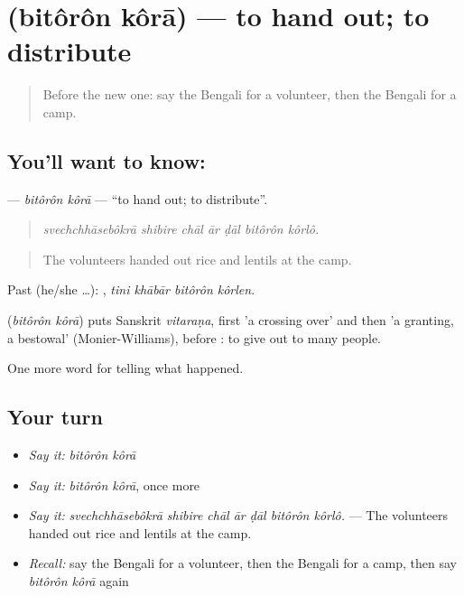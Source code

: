\section[\texorpdfstring{\bn{বিতরণ} \bn{করা} (bitôrôn kôrā)}{বিতরণ করা (bitôrôn kôrā)}]{  (bitôrôn kôrā) — to hand out; to distribute}

\label{lesson:BN-C291-bitoron-kora}



\begin{quote}
Before the new one: say the Bengali for a volunteer, then the Bengali for a camp.
\end{quote}

\subsection*{You'll want to know:  }
\textbf{ } — \emph{bitôrôn kôrā} — \textquotedblleft{}to hand out; to distribute\textquotedblright{}.

\begin{quote}
      
\end{quote}

\begin{quote}
\emph{svechchhāsebôkrā shibire chāl ār ḍāl bitôrôn kôrlô.}
\end{quote}

\begin{quote}
The volunteers handed out rice and lentils at the camp.
\end{quote}

Past (he/she …):    , \emph{tini khābār bitôrôn kôrlen}.

\begin{cousinweb}
\textbf{ } (\emph{bitôrôn kôrā}) puts Sanskrit \emph{vitaraṇa}, first 'a crossing over' and then 'a granting, a bestowal' (Monier-Williams), before : to give out to many people.
\end{cousinweb}

\begin{grammarlens}[title={What you've built}]
One more word for telling what happened.
\end{grammarlens}

\subsection*{Your turn}
\begin{itemize}
\raggedright
  \item \emph{Say it:} \emph{bitôrôn kôrā}
  \item \emph{Say it:} \emph{bitôrôn kôrā}, once more
  \item \emph{Say it:} \emph{svechchhāsebôkrā shibire chāl ār ḍāl bitôrôn kôrlô.} — The volunteers handed out rice and lentils at the camp.
  \item \emph{Recall:} say the Bengali for a volunteer, then the Bengali for a camp, then say \emph{bitôrôn kôrā} again
\end{itemize}

